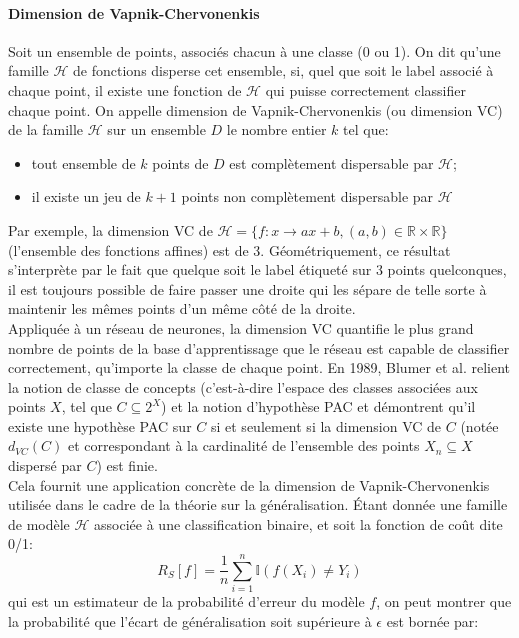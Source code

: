 \paragraph{Dimension de Vapnik-Chervonenkis}  Soit un ensemble de points, associés chacun à une classe (0 ou 1). On dit qu'une famille $\mathcal{H}$ de fonctions disperse cet ensemble, si, quel que soit le label associé à chaque point, il existe une fonction de $\mathcal{H}$ qui puisse correctement classifier chaque point. On appelle dimension de Vapnik-Chervonenkis (ou dimension VC) de la famille $\mathcal{H}$ sur un ensemble $D$ le nombre entier $k$ tel que:
\begin{itemize}
	\item tout ensemble de $k$ points de $D$ est complètement dispersable par $\mathcal{H}$;
	\item il existe un jeu de $k+1$ points non complètement dispersable par $\mathcal{H}$
\end{itemize}
Par exemple, la dimension VC de $\mathcal{H} = \{ f: x \to ax+b, (a, b) \in \mathbb{R}\times \mathbb{R} \}$ (l'ensemble des fonctions affines) est de 3. Géométriquement, ce résultat s'interprète par le fait que quelque soit le label étiqueté sur 3 points quelconques, il est toujours possible de faire passer une droite qui les sépare de telle sorte à maintenir les mêmes points d'un même côté de la droite. \\
Appliquée à un réseau de neurones, la dimension VC quantifie le plus grand nombre de points de la base d'apprentissage que le réseau est capable de classifier correctement, qu'importe la classe de chaque point.
En 1989, Blumer et al. \cite{blumerLearnabilityVapnikChervonenkisDimension1989} relient la notion de classe de concepts (c'est-à-dire l'espace des classes associées aux points $X$, tel que $C \subseteq 2^X$) et la notion d'hypothèse PAC et démontrent qu'il existe une hypothèse PAC sur $C$ si et seulement si la dimension VC de $C$ (notée $d_{VC}(C)$  et correspondant à la cardinalité de l'ensemble des points $X_n \subseteq X$ dispersé par $C$) est finie. \\
Cela fournit une application concrète de la dimension de Vapnik-Chervonenkis utilisée dans le cadre de la théorie sur la généralisation. Étant donnée une famille de modèle $\mathcal{H}$ associée à une classification binaire, et soit la fonction de coût dite 0/1:
\begin{equation}
	R_S[f] =\dfrac{1}{n}\sum_{i = 1}^n \mathbb{I}(f(X_i) \neq Y_i)
\end{equation}
qui est un estimateur de la probabilité d'erreur du modèle $f$, on peut montrer que la probabilité que l'écart de généralisation soit supérieure à $\epsilon$ est bornée par:

